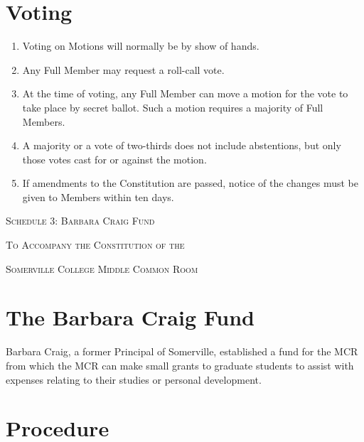 \documentclass[11pt, a4paper]{article}
\begin{document}
\section{Voting}
\label{sec:meetings_voting}

\begin{enumerate}
    \item Voting on Motions will normally be by show of hands.
    \item Any Full Member may request a roll-call vote.
    \item At the time of voting, any Full Member can move a motion for the vote to take place by secret ballot. Such a motion requires a majority of Full Members.
    \item A majority or a vote of two-thirds does not include abstentions, but only those votes cast for or against the motion.
    \item If amendments to the Constitution are passed, notice of the changes must be given to Members within ten days.
\end{enumerate}





\clearpage
\setcounter{section}{0}





\centerline{{\Huge \textsc{Schedule 3: Barbara Craig Fund}}}
\vspace{2mm}
\centerline{{\Large \textsc{To Accompany the Constitution of the}}}
\vspace{2mm}
\centerline{{\Large \textsc{Somerville College Middle Common Room}}}





\section{The Barbara Craig Fund}
\label{sec:bcf}
Barbara Craig, a former Principal of Somerville, established a fund for the MCR from which the MCR can make small grants to graduate students to assist with expenses relating to their studies or personal development.





\section{Procedure}
\label{sec:procedure}
\end{document}
